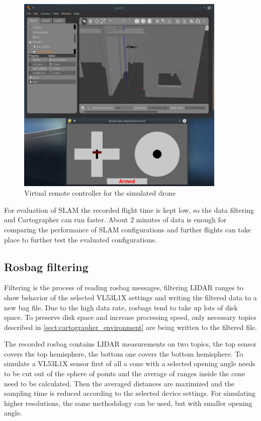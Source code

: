 \begin{figure}[!ht]
    \centering
    \includegraphics[width=100mm, keepaspectratio]{figures/fly_with_controller.png}
    \caption{Virtual remote controller for the simulated drone}
    \label{fig:remote_controller}
\end{figure}

For evaluation of SLAM the recorded flight time is kept low, so the data filtering and Cartographer 
can run faster. About 2 minutes of data is enough for comparing the performance of SLAM configurations
and further flights can take place to further test the evaluated configurations.

\subsection{Rosbag filtering}
Filtering is the process of reading rosbag messages, filtering LIDAR ranges to show behavior of the 
selected VL53L1X settings and writing the filtered data to a new bag file. Due to the high data rate, 
rosbags tend to take up lots of disk space. To preserve disk space and increase processing speed,
only necessary topics described in \ref{sect:cartographer_environment} are being written to the filtered file.

The recorded rosbag contains LIDAR measurements on two topics, the top sensor covers the top hemisphere,
the bottom one covers the bottom hemisphere. To simulate a VL53L1X sensor first of all a cone with a 
selected opening angle needs to be cut out of the sphere of points and the average of ranges inside the 
cone need to be calculated. Then the averaged distances are maximized and the sampling time is 
reduced according to the selected device settings. For simulating higher resolutions, the same methodology 
can be used, but with smaller opening angle.

